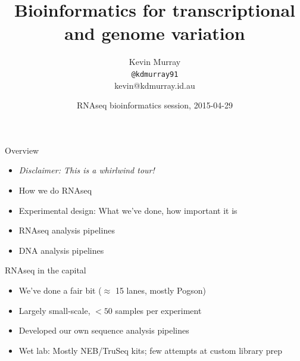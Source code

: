 \documentclass[t]{beamer}
\title{Bioinformatics for transcriptional and genome variation}
\author{Kevin Murray\\\tiny{\texttt{@kdmurray91}\\kevin@kdmurray.id.au}}
\institute{Borevitz Lab, ANU}
\date{RNAseq bioinformatics session, 2015-04-29}
\begin{document}
{
\begin{frame}
  \titlepage
  \vfill
\end{frame}
}

\begin{frame}{Overview}
  \begin{itemize}
    \item \textit{Disclaimer: This is a whirlwind tour!}
    \pause
    \item How we do RNAseq
    \item Experimental design: What we've done, how important it is
    \item RNAseq analysis pipelines
    \item DNA analysis pipelines
  \end{itemize}
\end{frame}

\begin{frame}{RNAseq in the capital}
  \begin{itemize}
    \item We've done a fair bit ($\approx$ 15 lanes, mostly Pogson)
    \item Largely small-scale, $<50$ samples per experiment
    \pause
    \item Developed our own sequence analysis pipelines
    \pause
    \item Wet lab: Mostly NEB/TruSeq kits; few attempts at custom library prep
  \end{itemize}
\end{frame}
\end{document}
